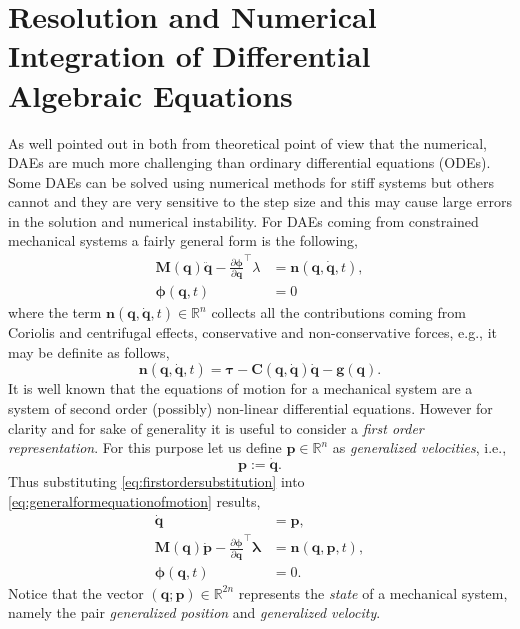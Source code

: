 %
%

\chapter{Resolution and Numerical Integration of Differential Algebraic Equations}

\label{ch:overview}

As well pointed out in \cite{petzold1982differential} both from theoretical
point of view that the numerical, DAEs are much more challenging than ordinary
differential equations (ODEs). Some DAEs can be solved using numerical methods
for stiff systems but others cannot and they are very sensitive to the step
size and this may cause large errors in the solution and numerical instability.
For DAEs coming from constrained mechanical systems a fairly general form is the following, 
\begin{subequations}
\label{eq:generalformequationofmotion}
	\begin{align}
		\bm{M}(\bm{q})\ddot{\bm{q}} 
		-\frac{\partial\bm{\phi}}{\partial\bm{q}}^{\intercal}\lambda 
		&= \bm{n}(\bm{q},\dot{\bm{q}},t),\\
		\bm{\phi}(\bm{q},t) &= 0
	\end{align}
\end{subequations}
where the term $\bm{n}(\bm{q},\dot{\bm{q}},t)\in\mathbb{R}^{n}$ collects all 
the contributions coming from Coriolis and centrifugal effects, 
conservative and non-conservative forces, e.g., it may be definite as follows,
\begin{equation*}
	\bm{n}(\bm{q},\dot{\bm{q}},t) = \bm{\tau}-\bm{C}(\bm{q},\dot{\bm{q}})\dot{\bm{q}}-\bm{g}(\bm{q}).
\end{equation*}
It is well known that the equations of motion for a mechanical
system are a system of second order (possibly) non-linear differential equations.
However for clarity and for sake of generality it is useful to consider a
\emph{first order representation}.
For this purpose let us define $\bm{p}\in\mathbb{R}^{n}$
as \emph{generalized velocities}, i.e.,
\begin{equation}
	\label{eq:firstordersubstitution}
	\bm{p} := \dot{\bm{q}}.
\end{equation}
Thus substituting \cref{eq:firstordersubstitution} into
\cref{eq:generalformequationofmotion} results, 
\begin{subequations}
\label{eq:generalequationofmotionfirstorder}
	\begin{align}
		\dot{\bm{q}} &= \bm{p}, \\
		\bm{M}(\bm{q})\dot{\bm{p}}
		-\frac{\partial\bm{\phi}}{\partial\bm{q}}^{\intercal}\bm{\lambda}
		&= \bm{n}(\bm{q},\bm{p},t),\\
		\bm{\phi}(\bm{q},t) &= 0.
	\end{align}
\end{subequations}
Notice that the vector $(\bm{q};\bm{p})\in\mathbb{R}^{2n}$
represents the \emph{state} of a mechanical system, namely the pair
\emph{generalized position} and \emph{generalized velocity}.

